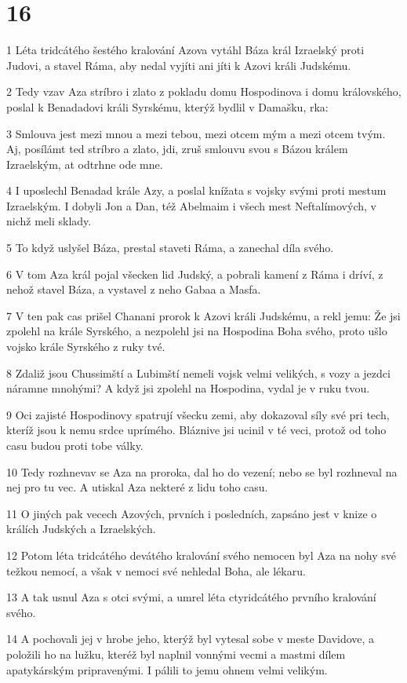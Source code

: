 \chapter{16}

\par 1 Léta tridcátého šestého kralování Azova vytáhl Báza král Izraelský proti Judovi, a stavel Ráma, aby nedal vyjíti ani jíti k Azovi králi Judskému.
\par 2 Tedy vzav Aza stríbro i zlato z pokladu domu Hospodinova i domu královského, poslal k Benadadovi králi Syrskému, kterýž bydlil v Damašku, rka:
\par 3 Smlouva jest mezi mnou a mezi tebou, mezi otcem mým a mezi otcem tvým. Aj, posílámt ted stríbro a zlato, jdi, zruš smlouvu svou s Bázou králem Izraelským, at odtrhne ode mne.
\par 4 I uposlechl Benadad krále Azy, a poslal knížata s vojsky svými proti mestum Izraelským. I dobyli Jon a Dan, též Abelmaim i všech mest Neftalímových, v nichž meli sklady.
\par 5 To když uslyšel Báza, prestal staveti Ráma, a zanechal díla svého.
\par 6 V tom Aza král pojal všecken lid Judský, a pobrali kamení z Ráma i dríví, z nehož stavel Báza, a vystavel z neho Gabaa a Masfa.
\par 7 V ten pak cas prišel Chanani prorok k Azovi králi Judskému, a rekl jemu: Že jsi zpolehl na krále Syrského, a nezpolehl jsi na Hospodina Boha svého, proto ušlo vojsko krále Syrského z ruky tvé.
\par 8 Zdaliž jsou Chussimští a Lubimští nemeli vojsk velmi velikých, s vozy a jezdci náramne mnohými? A když jsi zpolehl na Hospodina, vydal je v ruku tvou.
\par 9 Oci zajisté Hospodinovy spatrují všecku zemi, aby dokazoval síly své pri tech, kteríž jsou k nemu srdce uprímého. Bláznive jsi ucinil v té veci, protož od toho casu budou proti tobe války.
\par 10 Tedy rozhnevav se Aza na proroka, dal ho do vezení; nebo se byl rozhneval na nej pro tu vec. A utiskal Aza nekteré z lidu toho casu.
\par 11 O jiných pak vecech Azových, prvních i posledních, zapsáno jest v knize o králích Judských a Izraelských.
\par 12 Potom léta tridcátého devátého kralování svého nemocen byl Aza na nohy své težkou nemocí, a však v nemoci své nehledal Boha, ale lékaru.
\par 13 A tak usnul Aza s otci svými, a umrel léta ctyridcátého prvního kralování svého.
\par 14 A pochovali jej v hrobe jeho, kterýž byl vytesal sobe v meste Davidove, a položili ho na lužku, kteréž byl naplnil vonnými vecmi a mastmi dílem apatykárským pripravenými. I pálili to jemu ohnem velmi velikým.

